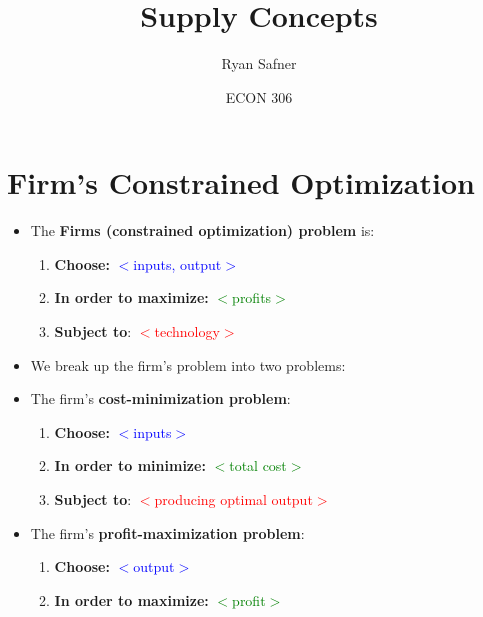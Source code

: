 \documentclass{article}
\title{Supply Concepts}
\author{Ryan Safner}
\date{ECON 306}
\begin{document}
\maketitle

\section*{Firm's Constrained Optimization}

\begin{itemize}
	\item The \textbf{Firms (constrained optimization) problem} is:  
	\begin{enumerate}
		\item \textbf{Choose:} \textcolor{blue}{$<$inputs, output$>$}
		\item \textbf{In order to maximize:} \textcolor{green}{$<$profits$>$}
		\item \textbf{Subject to}: \textcolor{red}{$<$technology$>$}
	\end{enumerate}
	\item We break up the firm's problem into two problems: 
	\item The firm's \textbf{cost-minimization problem}:
	\begin{enumerate}
		\item \textbf{Choose:} \textcolor{blue}{$<$inputs$>$}
		\item \textbf{In order to minimize:} \textcolor{green}{$<$total cost$>$}
		\item \textbf{Subject to}: \textcolor{red}{$<$producing optimal output$>$}
	\end{enumerate}
	\item The firm's \textbf{profit-maximization problem}:
	\begin{enumerate}
		\item \textbf{Choose:} \textcolor{blue}{$<$output$>$}
		\item \textbf{In order to maximize:} \textcolor{green}{$<$profit$>$}
	\end{enumerate}
\end{itemize}
\end{document}
